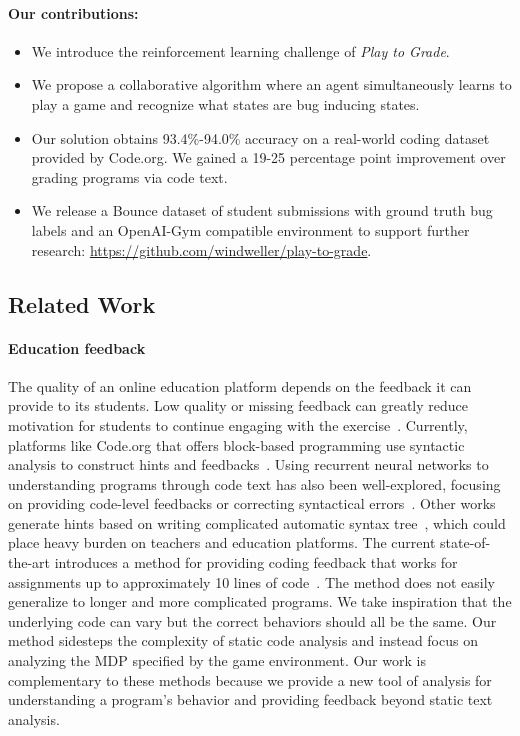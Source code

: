 \documentclass{article}
\newcommand{\EDIT}[1]{#1}%
\begin{document}
\paragraph{Our contributions:}

\begin{itemize}[leftmargin=*]
    \item We introduce the reinforcement learning challenge of \textit{Play to Grade}. 
    \item We propose a collaborative algorithm where an agent simultaneously learns to play a game and recognize what states are bug inducing states. %
    \item Our solution obtains 93.4\%-94.0\% accuracy on a real-world coding dataset provided by Code.org. We gained a 19-25 percentage point improvement over grading programs via code text.
    \item We release a Bounce dataset of student submissions \EDIT{with ground truth bug labels} and an OpenAI-Gym compatible environment to support further research:  \url{https://github.com/windweller/play-to-grade}.
\end{itemize}


\subsection{Related Work}
\vspace{-2mm} 




\paragraph{Education feedback} 
The quality of an online education platform depends on the feedback it can provide to its students. Low quality or missing feedback can greatly reduce motivation for students to continue engaging with the exercise~\cite{o2014hint}.
Currently, platforms like Code.org that offers block-based programming use syntactic analysis to construct hints and feedbacks~\cite{price2017position}. 
Using recurrent neural networks to understanding programs through code text has also been well-explored, focusing on providing code-level feedbacks or correcting syntactical errors~\citep{piech2015learning,bhatia2016automated}.
Other works generate hints based on writing complicated automatic syntax tree~\cite{rivers2017data,paassen2017continuous}, which could place heavy burden on teachers and education platforms.
The current state-of-the-art introduces a method for providing coding feedback that works for assignments up to approximately 10 lines of code~\cite{wu2019zero}. 
The method does not easily generalize to longer and more complicated programs.
We take inspiration that the underlying code can vary but the correct behaviors should all be the same.
Our method sidesteps the complexity of static code analysis and instead focus on analyzing the MDP specified by the game environment.
Our work is complementary to these methods because we provide a new tool of analysis for understanding a program's behavior and providing feedback beyond static text analysis.
\end{document}
